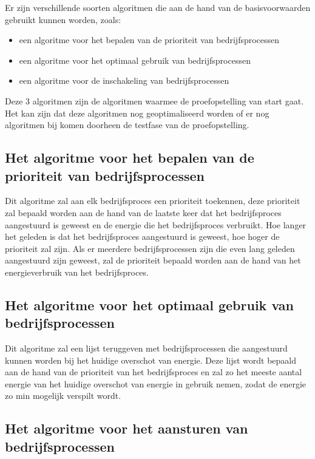 Er zijn verschillende soorten algoritmen die aan de hand van de basisvoorwaarden gebruikt kunnen worden, zoals:

\begin{itemize}
    \item een algoritme voor het bepalen van de prioriteit van bedrijfsprocessen
    \item een algoritme voor het optimaal gebruik van bedrijfsprocessen
    \item een algoritme voor de inschakeling van bedrijfsprocessen
\end{itemize}

Deze 3 algoritmen zijn de algoritmen waarmee de proefopstelling van start gaat. Het kan zijn dat deze algoritmen nog geoptimaliseerd worden of er nog algoritmen bij komen doorheen de testfase van de proefopstelling.

\subsection{Het algoritme voor het bepalen van de prioriteit van bedrijfsprocessen}
\label{sec:stand-van-zaken-algoritme-prioriteit}

Dit algoritme zal aan elk bedrijfsproces een prioriteit toekennen, deze prioriteit zal bepaald worden aan de hand van de laatste keer dat het bedrijfsproces aangestuurd is geweest en de energie die het bedrijfsproces verbruikt. Hoe langer het geleden is dat het bedrijfsproces aangestuurd is geweest, hoe hoger de prioriteit zal zijn. Als er meerdere bedrijfsprocessen zijn die even lang geleden aangestuurd zijn geweest, zal de prioriteit bepaald worden aan de hand van het energieverbruik van het bedrijfsproces.

\subsection{Het algoritme voor het optimaal gebruik van bedrijfsprocessen}
\label{sec:stand-van-zaken-algoritme-optimaal}

Dit algoritme zal een lijst teruggeven met bedrijfsprocessen die aangestuurd kunnen worden bij het huidige overschot van energie. Deze lijst wordt bepaald aan de hand van de prioriteit van het bedrijfsproces en zal zo het meeste aantal energie van het huidige overschot van energie in gebruik nemen, zodat de energie zo min mogelijk verspilt wordt.

\subsection{Het algoritme voor het aansturen van bedrijfsprocessen}
\label{sec:stand-van-zaken-algoritme-aansturen}

